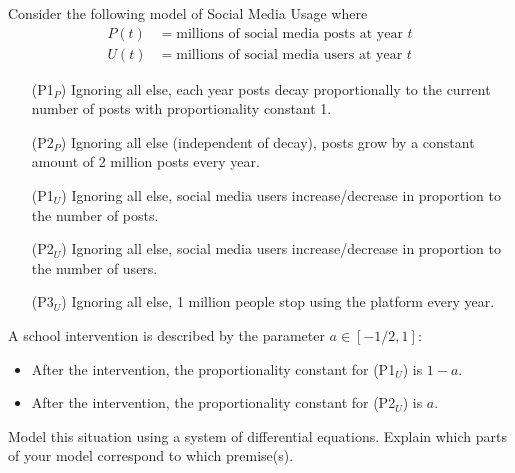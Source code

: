\documentclass{workbook}
\begin{document}
\begin{slide}
	\question
	Consider the following model of Social Media Usage where
	\begin{align*}
		P(t) &= \text{millions of social media posts at year $t$}\\
		U(t) &= \text{millions of social media users at year $t$}
	\end{align*}
	\begin{itemize}
		\item[(P1$_P$)] Ignoring all else, each year posts decay proportionally to the current number of posts with proportionality constant 1.
		\item[(P2$_P$)] Ignoring all else (independent of decay), posts grow by a constant amount of 2 million posts every year.
		\item[(P1$_U$)] Ignoring all else, social media users increase/decrease in proportion to the number of posts.
		\item[(P2$_U$)] Ignoring all else, social media users increase/decrease in proportion to the number of users.
		\item[(P3$_U$)] Ignoring all else, 1 million people stop using the platform every year.
	\end{itemize}

	\bigskip
	A school intervention is described by the parameter $a\in [-1/2, 1]$:
	\begin{itemize}
		\item After the intervention, the proportionality constant for (P1$_U$) is $1-a$.
		\item After the intervention, the proportionality constant for (P2$_U$) is $a$.
	\end{itemize}

	\begin{parts}
		\item Model this situation using a system of differential equations. Explain
			which parts of your model correspond to which premise(s).
	\end{parts}
\end{slide}
\end{document}
